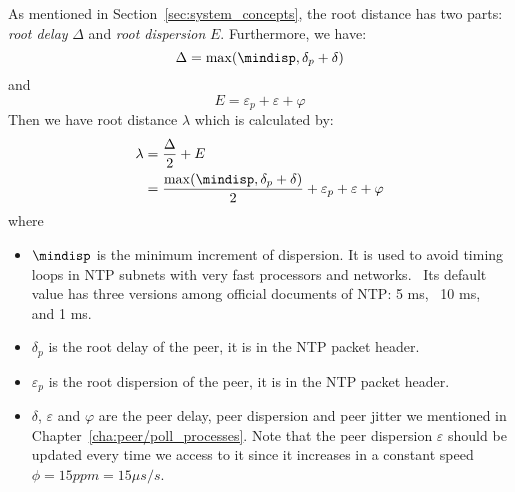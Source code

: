 As mentioned in Section~\ref{sec:system_concepts}, the root distance has two
parts: \emph{root delay} $\Delta$ and \emph{root dispersion} $E$. Furthermore, 
we have: 
\begin{equation}
    \Delta = \max(\mindisp, \delta_p + \delta)
    \label{eq:root_delay}
\end{equation}
and
\begin{equation}
    E = \varepsilon_p + \varepsilon + \varphi
    \label{eq:root_dispersion}
\end{equation}
Then we have root distance $\lambda$ which is calculated by:
\begin{align}
    \lambda & = \frac{\Delta}{2} + E\\
    & =\frac{\max(\mindisp, \delta_p + \delta)}{2} 
    + \varepsilon_p + \varepsilon + \varphi
    \label{eq:root_distance}
\end{align}
where 
\begin{itemize}
    \item $\mindisp$ is the minimum increment of dispersion. It is used to
        avoid timing loops in NTP subnets with very fast processors and
        networks.~\cite{rfc5905} Its default value has three versions among
        official documents of NTP: 5 ms,~\cite{rfc5905} 10 ms,~\cite{rfc5905}
        and 1 ms.~\cite{performance_metrics}
    \item $\delta_p$ is the root delay of the peer, it is in the NTP packet
        header.
    \item $\varepsilon_p$ is the root dispersion of the peer, it is in the NTP
        packet header.
    \item $\delta$, $\varepsilon$ and $\varphi$ are the peer delay, peer
        dispersion and peer jitter we mentioned in
        Chapter~\ref{cha:peer/poll_processes}. Note that the peer dispersion
        $\varepsilon$ should be updated every time we access to it since it
        increases in a constant speed $\phi = 15 ppm = 15 \mu s/s$.
\end{itemize}

